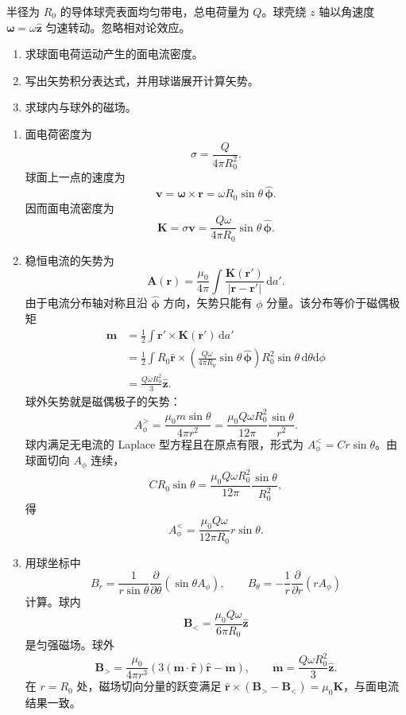 \begin{question}[均匀带电旋转球壳的稳恒磁场]
半径为 $R_0$ 的导体球壳表面均匀带电，总电荷量为 $Q$。球壳绕 $z$ 轴以角速度 $\boldsymbol\omega=\omega\hat{\mathbf z}$ 匀速转动。忽略相对论效应。
\begin{enumerate}
  \item 求球面电荷运动产生的面电流密度。
  \item 写出矢势积分表达式，并用球谐展开计算矢势。
  \item 求球内与球外的磁场。
\end{enumerate}
\begin{solution}
\begin{enumerate}
  \item 面电荷密度为
  \[
    \sigma=\frac{Q}{4\pi R_0^2} .
  \]
  球面上一点的速度为
  \[
    \mathbf v=\boldsymbol\omega\times\mathbf r
    =\omega R_0\sin\theta\,\hat{\boldsymbol\phi} .
  \]
  因而面电流密度为
  \[
    \boxed{\mathbf K=\sigma\mathbf v
    =\frac{Q\omega}{4\pi R_0}\sin\theta\,\hat{\boldsymbol\phi}} .
  \]

  \item 稳恒电流的矢势为
  \[
    \mathbf A(\mathbf r)=\frac{\mu_0}{4\pi}\int
    \frac{\mathbf K(\mathbf r')}{|\mathbf r-\mathbf r'|}\,\mathrm da' .
  \]
  由于电流分布轴对称且沿 $\hat{\boldsymbol\phi}$ 方向，矢势只能有 $\phi$ 分量。该分布等价于磁偶极矩
  \[
  \begin{aligned}
    \mathbf m&=\frac12\int \mathbf r'\times\mathbf K(\mathbf r')\,\mathrm da' \\
    &=\frac12\int R_0\hat{\mathbf r}\times
      \left(\frac{Q\omega}{4\pi R_0}\sin\theta\,\hat{\boldsymbol\phi}\right)
      R_0^2\sin\theta\,\mathrm d\theta\mathrm d\phi \\
    &=\frac{Q\omega R_0^2}{3}\hat{\mathbf z} .
  \end{aligned}
  \]
  球外矢势就是磁偶极子的矢势：
  \[
    \boxed{A_\phi^{>}=\frac{\mu_0m\sin\theta}{4\pi r^2}
    =\frac{\mu_0Q\omega R_0^2}{12\pi}\frac{\sin\theta}{r^2}} .
  \]
  球内满足无电流的 Laplace 型方程且在原点有限，形式为 $A_\phi^{<}=Cr\sin\theta$。由球面切向 $A_\phi$ 连续，
  \[
    CR_0\sin\theta=\frac{\mu_0Q\omega R_0^2}{12\pi}\frac{\sin\theta}{R_0^2},
  \]
  得
  \[
    \boxed{A_\phi^{<}=\frac{\mu_0Q\omega}{12\pi R_0}r\sin\theta} .
  \]

  \item 用球坐标中
  \[
    B_r=\frac{1}{r\sin\theta}\frac{\partial}{\partial\theta}(\sin\theta A_\phi),
    \qquad
    B_\theta=-\frac1r\frac{\partial}{\partial r}(rA_\phi)
  \]
  计算。球内
  \[
    \boxed{\mathbf B_< = \frac{\mu_0Q\omega}{6\pi R_0}\hat{\mathbf z}}
  \]
  是匀强磁场。球外
  \[
    \boxed{\mathbf B_>
    =\frac{\mu_0}{4\pi r^3}\left(3(\mathbf m\cdot\hat{\mathbf r})\hat{\mathbf r}-\mathbf m\right),
    \qquad
    \mathbf m=\frac{Q\omega R_0^2}{3}\hat{\mathbf z}} .
  \]
  在 $r=R_0$ 处，磁场切向分量的跃变满足 $\hat{\mathbf r}\times(\mathbf B_>-\mathbf B_<)=\mu_0\mathbf K$，与面电流结果一致。
\end{enumerate}
\end{solution}
\end{question}

